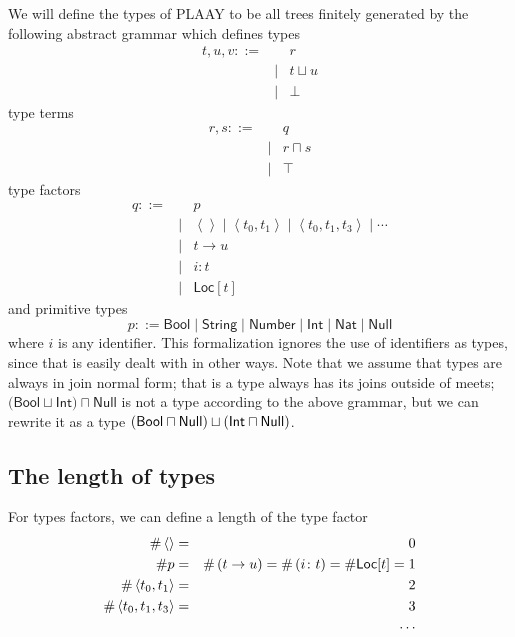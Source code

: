 \documentclass[12pt]{article}
\begin{document}
We will define the types of PLAAY to be all trees finitely generated by the
following abstract grammar which defines types%
\begin{eqnarray*}
t,u,v::= &&r \\
&\mid &t\sqcup u \\
&\mid &\bot 
\end{eqnarray*}%
type terms%
\begin{eqnarray*}
r,s::= &&q \\
&\mid &r\sqcap s \\
&\mid &\top 
\end{eqnarray*}%
type factors%
\begin{eqnarray*}
q::= &&p \\
&\mid &\left\langle {}\right\rangle \mid \left\langle
t_{0},t_{1}\right\rangle \mid \left\langle t_{0},t_{1},t_{3}\right\rangle
\mid \cdots  \\
&\mid &t\rightarrow u \\
&\mid &i\colon t \\
&\mid &\mathsf{Loc}[t]
\end{eqnarray*}%
and primitive types%
\begin{equation*}
p::=\mathsf{Bool\mid String\mid Number}\mid \mathsf{Int}\mid \mathsf{Nat}%
\mid \mathsf{Null}
\end{equation*}%
where $i$ is any identifier. This formalization ignores the use of
identifiers as types, since that is easily dealt with in other ways. Note
that we assume that types are always in join normal form; that is a type
always has its joins outside of meets; $(\mathsf{Bool}\sqcup \mathsf{Int}%
\mathrm{)}\sqcap \mathsf{Null}$ is not a type according to the above
grammar, but we can rewrite it as a type $\left( \mathsf{Bool}\sqcap \mathsf{%
Null}\right) \sqcup \left( \mathsf{Int}\sqcap \mathsf{Null}\right) $.

\subsection{The length of types}

For types factors, we can define a length of the type factor%
\begin{eqnarray*}
\#\left\langle {}\right\rangle  &=&0 \\
\#p &=&\#\left( t\rightarrow u\right) =\#\left( i\colon t\right) =\#\mathsf{%
Loc}[t]=1 \\
\#\left\langle t_{0},t_{1}\right\rangle  &=&2 \\
\#\left\langle t_{0},t_{1},t_{3}\right\rangle  &=&3 \\
&&\cdots 
\end{eqnarray*}
\end{document}
